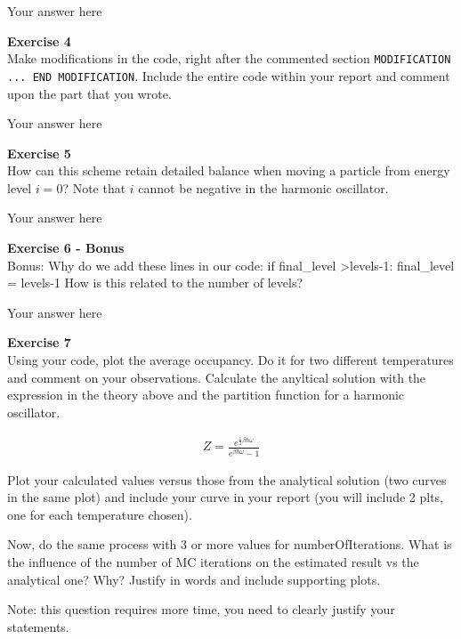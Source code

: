 \documentclass{article}
\begin{document}
Your answer here

\begin{mdframed}
\textbf{Exercise 4}\\
Make modifications in the code, right after the commented section \texttt{MODIFICATION ... END MODIFICATION}. Include the entire code within your report and comment upon the part that you wrote.
\end{mdframed}

Your answer here

\begin{mdframed}
\textbf{Exercise 5}\\
How can this scheme retain detailed balance when moving a particle from energy level $i = 0$? Note that $i$  cannot be negative in the harmonic oscillator.
\end{mdframed}

Your answer here

\begin{mdframed}
\textbf{Exercise 6 - Bonus}\\
Bonus: Why do we add these lines in our code:
if final\_level \textgreater  levels-1:
final\_level = levels-1
How is this related to the number of levels?
\end{mdframed}

Your answer here

\begin{mdframed}
\textbf{Exercise 7}\\
Using your code, plot the average occupancy.
Do it for two different temperatures and comment on your observations.
Calculate the anyltical solution with the expression in the theory above and the partition function for a harmonic oscillator.

\begin{align}
    Z = \frac{e^{\frac12 \beta \hbar \omega}}{e^{\beta \hbar \omega}-1}
\end{align}

Plot your calculated values versus those from the analytical solution (two curves in the same plot) and include your curve in your report (you will include 2 plts, one for each temperature chosen).

Now, do the same process with 3 or more values for numberOfIterations.
What is the influence of the number of MC iterations on the estimated result vs the analytical one? Why? Justify in words and include supporting plots.

Note: this question requires more time, you need to clearly justify your statements.
\end{mdframed}
\end{document}
